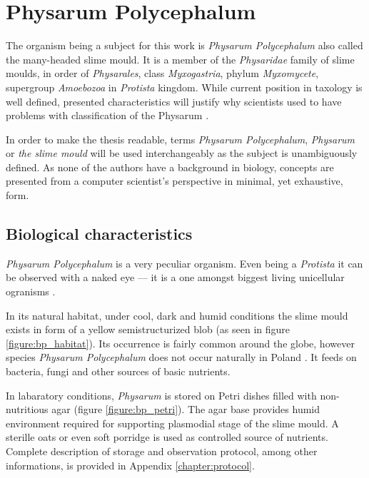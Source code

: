 \section{Physarum Polycephalum}
\label{section:background_physarum}

The organism being a subject for this work is \textit{Physarum Polycephalum} also called the many-headed slime mould. It is a member of the \textit{Physaridae} family of slime moulds, in order of \textit{Physarales}, class \textit{Myxogastria}, phylum \textit{Myxomycete}, supergroup \textit{Amoebozoa} in \textit{Protista} kingdom. While current position in taxology is well defined, presented characteristics will justify why scientists used to have problems with classification of the Physarum \cite{stephenson1994myxomycetes}.

In order to make the thesis readable, terms \textit{Physarum Polycephalum}, \textit{Physarum} or \textit{the slime mould} will be used interchangeably as the subject is unambiguously defined. As none of the authors have a background in biology, concepts are presented from a computer scientist's perspective in minimal, yet exhaustive, form.


\subsection{Biological characteristics}

\textit{Physarum Polycephalum} is a very peculiar organism. Even being a \textit{Protista} it can be observed with a naked eye --- it is a one amongst biggest living unicellular ogranisms \cite{TODO}. 

In its natural habitat, under cool, dark and humid conditions the slime mould exists in form of a yellow semistructurized blob (as seen in figure \ref{figure:bp_habitat}). Its occurrence is fairly common around the globe, however species \textit{Physarum Polycephalum} does not occur naturally in Poland \cite{narkiewicz2013grzyby}. It feeds on bacteria, fungi and other sources of basic nutrients.

In labaratory conditions, \textit{Physarum} is stored on Petri dishes filled with non-nutritious agar (figure \ref{figure:bp_petri}). The agar base provides humid environment required for supporting plasmodial stage of the slime mould. A sterille oats or even soft porridge is used as controlled source of nutrients. Complete description of storage and observation protocol, among other informations, is provided in Appendix \ref{chapter:protocol}.

